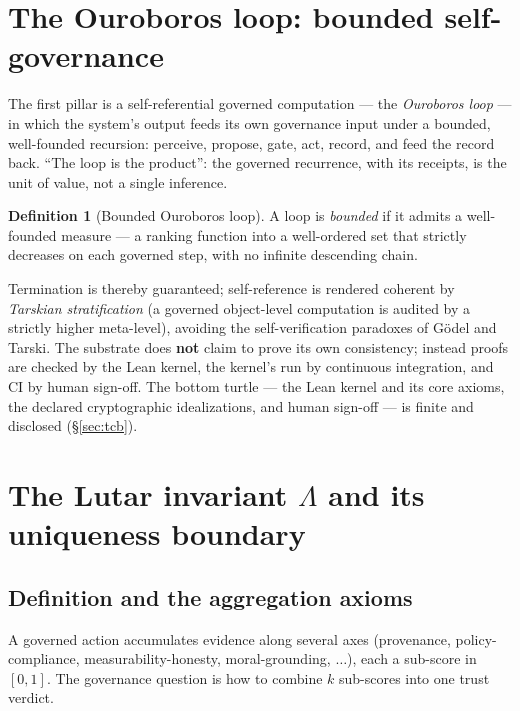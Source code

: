 \documentclass[11pt]{article}
\theoremstyle{plain}
\theoremstyle{definition}
\newtheorem{definition}[theorem]{Definition}
\theoremstyle{remark}
\newcommand{\La}{\Lambda}
\begin{document}
\section{The Ouroboros loop: bounded self-governance}
\label{sec:loop}

The first pillar is a self-referential governed computation --- the
\emph{Ouroboros loop} --- in which the system's output feeds its own governance
input under a bounded, well-founded recursion: perceive, propose, gate, act,
record, and feed the record back. ``The loop is the product'': the governed
recurrence, with its receipts, is the unit of value, not a single inference.

\begin{definition}[Bounded Ouroboros loop]
A loop is \emph{bounded} if it admits a well-founded measure --- a ranking
function into a well-ordered set that strictly decreases on each governed step,
with no infinite descending chain.
\end{definition}

Termination is thereby guaranteed; self-reference is rendered coherent by
\emph{Tarskian stratification} (a governed object-level computation is audited by
a strictly higher meta-level), avoiding the self-verification paradoxes of
G\"odel and Tarski. The substrate does \textbf{not} claim to prove its own
consistency; instead proofs are checked by the Lean kernel, the kernel's run by
continuous integration, and CI by human sign-off. The bottom turtle --- the Lean
kernel and its core axioms, the declared cryptographic idealizations, and human
sign-off --- is finite and disclosed (\S\ref{sec:tcb}).

\section{The Lutar invariant $\La$ and its uniqueness boundary}
\label{sec:lambda}

\subsection{Definition and the aggregation axioms}
\label{sec:axioms}
A governed action accumulates evidence along several axes (provenance,
policy-compliance, measurability-honesty, moral-grounding, $\dots$), each a
sub-score in $[0,1]$. The governance question is how to combine $k$ sub-scores
into one trust verdict.
\end{document}
